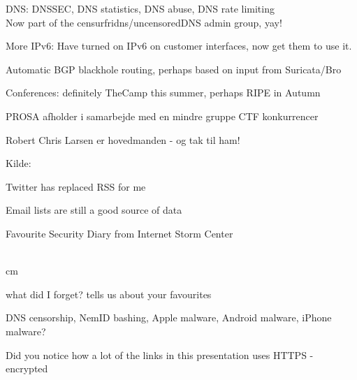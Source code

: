 \documentclass[20pt,landscape,a4paper,footrule]{foils}
\begin{document}

\begin{list1}
\item DNS: DNSSEC, DNS statistics, DNS abuse, DNS rate limiting\\
Now part of the censurfridns/uncensoredDNS admin group, yay!
\item More IPv6: Have turned on IPv6 on customer interfaces, now get them to use it.
\item Automatic BGP blackhole routing, perhaps based on input from Suricata/Bro
\item Conferences: definitely TheCamp this summer, perhaps RIPE in Autumn
\end{list1}




\begin{list1}
\item PROSA afholder i samarbejde med en mindre gruppe CTF konkurrencer 
\item Robert Chris Larsen er hovedmanden - og tak til ham!
\end{list1}
Kilde: 




\begin{list1}
\item Twitter has replaced RSS for me
\item Email lists are still a good source of data
\item Favourite Security Diary from Internet Storm Center\\
 \\
\end{list1}




 cm

\centerline{\Large what did I forget? tells us about your favourites \smiley}

DNS censorship, NemID bashing, Apple malware, Android malware, iPhone malware?

Did you notice how a lot of the links in this presentation uses HTTPS - encrypted

\myquestionspage
\end{document}
